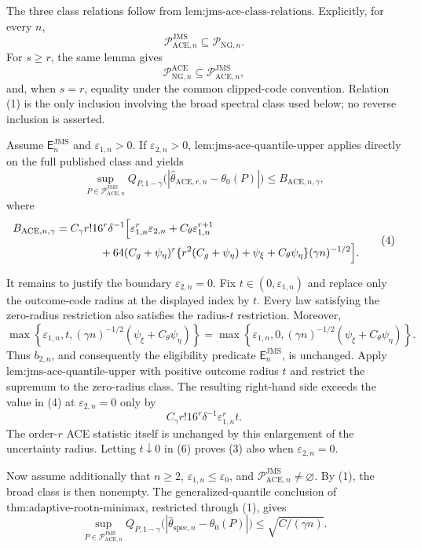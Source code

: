 The three class relations follow from \(\text{lem:jms-ace-class-relations}\).  Explicitly, for every \(n\),
\[
 \mathcal P_{\mathrm{ACE},n}^{\mathrm{JMS}}
 \subseteq \mathcal P_{\mathrm{NG},n}.
 \tag{1}
\]
For \(s\ge r\), the same lemma gives
\[
 \mathcal P_{\mathrm{NG},n}^{\mathrm{ACE}}
 \subseteq \mathcal P_{\mathrm{ACE},n}^{\mathrm{JMS}},
 \tag{2}
\]
and, when \(s=r\), equality under the common clipped-code convention.  Relation (1) is the only inclusion involving the broad spectral class used below; no reverse inclusion is asserted.

Assume \(\mathsf E_n^{\mathrm{JMS}}\) and \(\varepsilon_{1,n}>0\).  If \(\varepsilon_{2,n}>0\), \(\text{lem:jms-ace-quantile-upper}\) applies directly on the full published class and yields
\[
 \sup_{P\in\mathcal P_{\mathrm{ACE},n}^{\mathrm{JMS}}}
 Q_{P,1-\gamma}
 \bigl(|\widehat\theta_{\mathrm{ACE},r,n}-\theta_0(P)|\bigr)
 \le B_{\mathrm{ACE},n,\gamma},
 \tag{3}
\]
where
\[
\begin{aligned}
 B_{\mathrm{ACE},n,\gamma}
 &=C_{\gamma}r!16^r\delta^{-1}
 \Bigl[\varepsilon_{1,n}^r\varepsilon_{2,n}
 +C_{\theta}\varepsilon_{1,n}^{r+1}\\
 &\qquad\qquad
 +64(C_g+\psi_{\eta})^r
 \{r^2(C_g+\psi_{\eta})+\psi_{\xi}
      +C_{\theta}\psi_{\eta}\}
 (\gamma n)^{-1/2}\Bigr].
\end{aligned}
\tag{4}
\]

It remains to justify the boundary \(\varepsilon_{2,n}=0\).  Fix \(t\in(0,\varepsilon_{1,n})\) and replace only the outcome-code radius at the displayed index by \(t\).  Every law satisfying the zero-radius restriction also satisfies the radius-\(t\) restriction.  Moreover,
\[
 \max\!\left\{\varepsilon_{1,n},t,
  (\gamma n)^{-1/2}(\psi_{\xi}+C_{\theta}\psi_{\eta})\right\}
 =
 \max\!\left\{\varepsilon_{1,n},0,
  (\gamma n)^{-1/2}(\psi_{\xi}+C_{\theta}\psi_{\eta})\right\}.
 \tag{5}
\]
Thus \(b_{2,n}\), and consequently the eligibility predicate \(\mathsf E_n^{\mathrm{JMS}}\), is unchanged.  Apply \(\text{lem:jms-ace-quantile-upper}\) with positive outcome radius \(t\) and restrict the supremum to the zero-radius class.  The resulting right-hand side exceeds the value in (4) at \(\varepsilon_{2,n}=0\) only by
\[
 C_{\gamma}r!16^r\delta^{-1}\varepsilon_{1,n}^rt.
 \tag{6}
\]
The order-\(r\) ACE statistic itself is unchanged by this enlargement of the uncertainty radius.  Letting \(t\downarrow0\) in (6) proves (3) also when \(\varepsilon_{2,n}=0\).

Now assume additionally that \(n\ge2\), \(\varepsilon_{1,n}\le\varepsilon_0\), and \(\mathcal P_{\mathrm{ACE},n}^{\mathrm{JMS}}\neq\varnothing\).  By (1), the broad class is then nonempty.  The generalized-quantile conclusion of \(\text{thm:adaptive-rootn-minimax}\), restricted through (1), gives
\[
 \sup_{P\in\mathcal P_{\mathrm{ACE},n}^{\mathrm{JMS}}}
 Q_{P,1-\gamma}
 \bigl(|\widehat\theta_{\mathrm{spec},n}-\theta_0(P)|\bigr)
 \le \sqrt{C/(\gamma n)}.
 \tag{7}
\]

